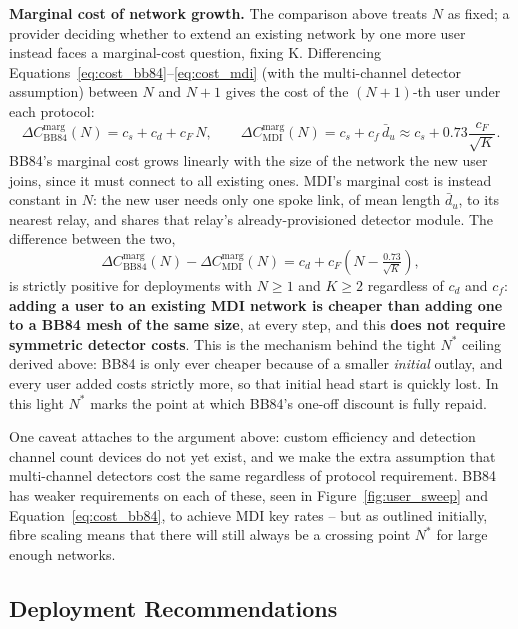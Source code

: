 \documentclass[12pt]{article}
\begin{document}
\textbf{Marginal cost of network growth.} The comparison above treats $N$ as fixed; a provider deciding whether to extend an existing network by one more user instead faces a marginal-cost question, fixing K. Differencing Equations~\ref{eq:cost_bb84}--\ref{eq:cost_mdi} (with the multi-channel detector assumption) between $N$ and $N+1$ gives the cost of the $(N{+}1)$-th user under each protocol:
\begin{equation}
    \Delta C_\text{BB84}^\text{marg}(N) = c_s + c_d + c_F\,N, \qquad \Delta C_\text{MDI}^\text{marg}(N) = c_s + c_f\,\bar d_u \approx c_s + 0.73\frac{c_F}{\sqrt K}.
    \label{eq:marginal_cost}
\end{equation}
BB84's marginal cost grows linearly with the size of the network the new user joins, since it must connect to all existing ones. MDI's marginal cost is instead constant in $N$: the new user needs only one spoke link, of mean length $\bar d_u$, to its nearest relay, and shares that relay's already-provisioned detector module. The difference between the two,
\begin{equation}
    \Delta C_\text{BB84}^\text{marg}(N) - \Delta C_\text{MDI}^\text{marg}(N) = c_d + c_F\left(N - \tfrac{0.73}{\sqrt K}\right),
    \label{eq:marginal_cost_delta}
\end{equation}
is strictly positive for deployments with $N\geq1$ and $K\geq2$ regardless of $c_d$ and $c_f$: \textbf{adding a user to an existing MDI network is cheaper than adding one to a BB84 mesh of the same size}, at every step, and this \textbf{does not require symmetric detector costs}. This is the mechanism behind the tight $N^*$ ceiling derived above: BB84 is only ever cheaper because of a smaller \emph{initial} outlay, and every user added costs strictly more, so that initial head start is quickly lost. In this light $N^*$ marks the point at which BB84's one-off discount is fully repaid.

One caveat attaches to the argument above: custom efficiency and detection channel count devices do not yet exist, and we make the extra assumption that multi-channel detectors cost the same regardless of protocol requirement. BB84 has weaker requirements on each of these, seen in Figure~\ref{fig:user_sweep} and Equation~\ref{eq:cost_bb84}, to achieve MDI key rates -- but as outlined initially, fibre scaling means that there will still always be a crossing point $N^*$ for large enough networks.

\subsection{Deployment Recommendations}
\label{sec:results_deployment}
\end{document}
